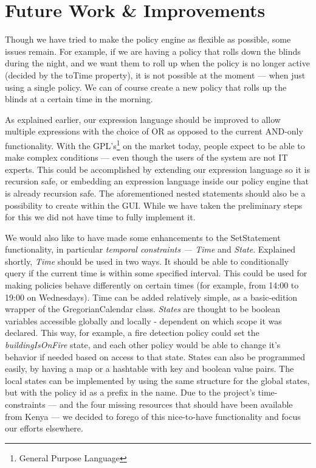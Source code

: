 \section{Future Work \& Improvements}\label{subsec:improvements}
Though we have tried to make the policy engine as flexible as possible, some issues remain. For example, if we are having a policy that rolls down the blinds during the night, and we want them to roll up when the policy is no longer active (decided by the toTime property), it is not possible at the moment --- when just using a single policy. We can of course create a new policy that rolls up the blinds at a certain time in the morning.

As explained earlier, our expression language should be improved to allow multiple expressions with the choice of OR as opposed to the current AND-only functionality. With the GPL's\footnote{General Purpose Language} on the market today, people expect to be able to make complex conditions --- even though the users of the system are not IT experts. This could be accomplished by extending our expression language so it is recursion safe, or embedding an expression language inside our policy engine that is already recursion safe. The aforementioned nested statements should also be a possibility to create within the GUI. While we have taken the preliminary steps for this we did not have time to fully implement it.

We would also like to have made some enhancements to the SetStatement functionality, in particular \textit{temporal constraints --- Time} and \textit{State}. Explained shortly, \textit{Time} should be used in two ways. It should be able to conditionally query if the current time is within some specified interval. This could be used for making policies behave differently on certain times (for example, from 14:00 to 19:00 on Wednesdays). Time can be added relatively simple, as a basic-edition wrapper of the GregorianCalendar class. \textit{States} are thought to be boolean variables accessible globally and locally - dependent on which scope it was declared. This way, for example, a fire detection policy could set the \textit{buildingIsOnFire} state, and each other policy would be able to change it's behavior if needed based on access to that state. States can also be programmed easily, by having a map or a hashtable with key and boolean value pairs. The local states can be implemented by using the same structure for the global states, but with the policy id as a prefix in the name. Due to the project's time-constraints --- and the four missing resources that should have been available from Kenya --- we decided to forego of this nice-to-have functionality and focus our efforts elsewhere. 

